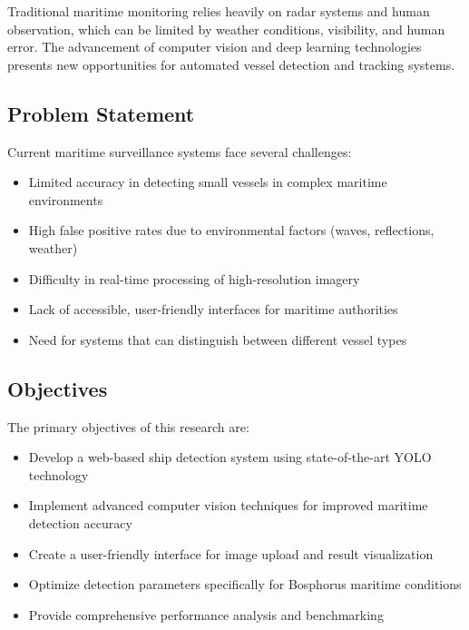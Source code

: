 \documentclass[a4paper,11pt]{article}
\begin{document}
Traditional maritime monitoring relies heavily on radar systems and human observation, which can be limited by weather conditions, visibility, and human error. The advancement of computer vision and deep learning technologies presents new opportunities for automated vessel detection and tracking systems.

\subsection{Problem Statement}
Current maritime surveillance systems face several challenges:
\begin{itemize}
    \item Limited accuracy in detecting small vessels in complex maritime environments
    \item High false positive rates due to environmental factors (waves, reflections, weather)
    \item Difficulty in real-time processing of high-resolution imagery
    \item Lack of accessible, user-friendly interfaces for maritime authorities
    \item Need for systems that can distinguish between different vessel types
\end{itemize}

\subsection{Objectives}
The primary objectives of this research are:
\begin{itemize}
    \item Develop a web-based ship detection system using state-of-the-art YOLO technology
    \item Implement advanced computer vision techniques for improved maritime detection accuracy
    \item Create a user-friendly interface for image upload and result visualization
    \item Optimize detection parameters specifically for Bosphorus maritime conditions
    \item Provide comprehensive performance analysis and benchmarking
\end{itemize}
\end{document}
